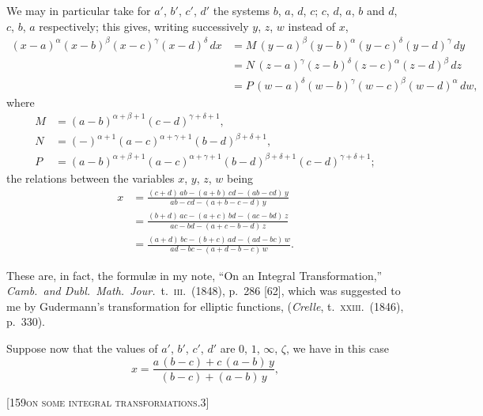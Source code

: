 \documentclass[11pt]{article}
\begin{document}
We may in particular take for $a'$, $b'$, $c'$, $d'$ the systems $b$, $a$, $d$, $c$; $c$, $d$, $a$, $b$ and $d$, $c$, $b$, $a$
respectively; this gives, writing successively $y$, $z$, $w$ instead of $x$,
\begin{align*}
(x-a)^{\alpha}(x-b)^{\beta}(x-c)^{\gamma}(x-d)^{\delta}\, dx
&= M\,(y-a)^{\beta}(y-b)^{\alpha}(y-c)^{\delta}(y-d)^{\gamma}\, dy\\
&= N\,(z-a)^{\gamma}(z-b)^{\delta}(z-c)^{\alpha}(z-d)^{\beta}\, dz\\
&= P\,(w-a)^{\delta}(w-b)^{\gamma}(w-c)^{\beta}(w-d)^{\alpha}\, dw,
\end{align*}
where
\begin{align*}
M &= (a-b)^{\alpha+\beta+1}(c-d)^{\gamma+\delta+1},\\
N &= (-)^{\alpha+1}(a-c)^{\alpha+\gamma+1}(b-d)^{\beta+\delta+1},\\
P &= (a-b)^{\alpha+\beta+1}(a-c)^{\alpha+\gamma+1}(b-d)^{\beta+\delta+1}(c-d)^{\gamma+\delta+1};
\end{align*}
the relations between the variables $x$, $y$, $z$, $w$ being
\begin{align*}
x &= \frac{(c+d)\,ab - (a+b)\,cd - (ab-cd)\,y}{ab - cd - (a+b-c-d)\,y}\\
  &= \frac{(b+d)\,ac - (a+c)\,bd - (ac-bd)\,z}{ac - bd - (a+c-b-d)\,z}\\
  &= \frac{(a+d)\,bc - (b+c)\,ad - (ad-bc)\,w}{ad - bc - (a+d-b-c)\,w}.
\end{align*}

These are, in fact, the formul\ae{} in my note, ``On an Integral Transformation,'' \textit{Camb.\
and Dubl.\ Math.\ Jour.}\ t.~\textsc{iii}.\ (1848), p.~286 [62], which was suggested to me by
Gudermann's transformation for elliptic functions, (\textit{Crelle}, t.~\textsc{xxiii}.\ (1846), p.~330).

\medskip

Suppose now that the values of $a'$, $b'$, $c'$, $d'$ are $0$, $1$, $\infty$, $\zeta$, we have in this case
\[
x = \frac{a\,(b-c) + c\,(a-b)\, y}{(b-c) + (a-b)\, y},
\]

\newpage

\begin{center}
\small [159\hfill\textsc{on some integral transformations.}\hfill\textsc{3}]
\end{center}

\medskip
\end{document}
